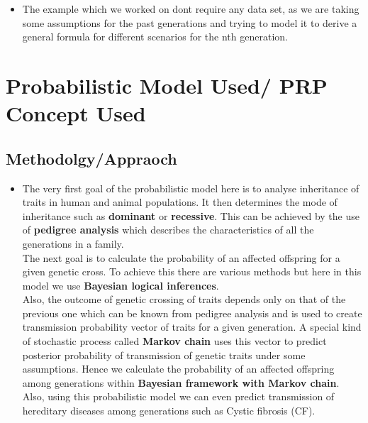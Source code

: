 \documentclass{article}
\begin{document}
\begin{itemize}
    \item The example which we worked on dont require any data set, as we are taking some assumptions for the past generations and trying to model it to derive a general formula for different scenarios for the nth generation.        
\end{itemize}
\section {Probabilistic Model Used/ PRP Concept Used}

\subsection{Methodolgy/Appraoch}

\begin{itemize}
 
\item The very first goal of the probabilistic model here is to analyse inheritance of traits in human and animal populations. It then determines the mode of inheritance such as \textbf{dominant} or \textbf{recessive}. This can be achieved by the use of \textbf{pedigree analysis} which describes the characteristics of all the generations in a family.\\
The next goal is to calculate the probability of an affected offspring for a given genetic cross. To achieve this there are various methods but here in this model we use \textbf{Bayesian logical inferences}.\\
Also, the outcome of genetic crossing of traits depends only on that of the previous one which can be known from pedigree analysis and is used to create transmission probability vector of traits for a given generation. A special kind of stochastic process called \textbf{Markov chain} uses this vector to predict posterior probability of transmission of genetic traits under some assumptions. Hence we calculate the probability of an affected offspring among generations within \textbf{Bayesian framework with Markov chain}. Also, using this probabilistic model we can even predict transmission of hereditary diseases among generations such as Cystic fibrosis (CF).
\end{itemize} 
\end{document}
